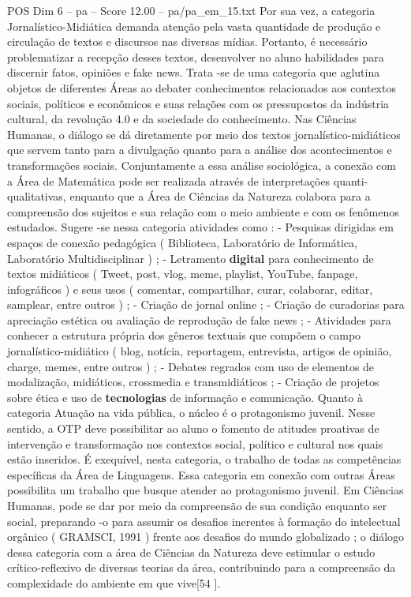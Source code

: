 \begin{textsample}{POS Dim 6 – pa – Score 12.00 – pa/pa\_em\_15.txt}
Por sua vez, a categoria Jornalístico-Midiática demanda atenção pela vasta quantidade de produção e circulação de textos e discursos nas diversas mídias.
Portanto, é necessário problematizar a recepção desses textos, desenvolver no aluno habilidades para discernir fatos, opiniões e fake news.
Trata -se de uma categoria que aglutina objetos de diferentes Áreas ao debater conhecimentos relacionados aos contextos sociais, políticos e econômicos e suas relações com os pressupostos da indústria cultural, da revolução 4.0 e da sociedade do conhecimento.
Nas Ciências Humanas, o diálogo se dá diretamente por meio dos textos jornalístico-midiáticos que servem tanto para a divulgação quanto para a análise dos acontecimentos e transformações sociais.
Conjuntamente a essa análise sociológica, a conexão com a Área de Matemática pode ser realizada através de interpretações quanti-qualitativas, enquanto que a Área de Ciências da Natureza colabora para a compreensão dos sujeitos e sua relação com o meio ambiente e com os fenômenos estudados.
Sugere -se nessa categoria atividades como : - Pesquisas dirigidas em espaços de conexão pedagógica ( Biblioteca, Laboratório de Informática, Laboratório Multidisciplinar ) ; - Letramento \textbf{digital} para conhecimento de textos midiáticos ( Tweet, post, vlog, meme, playlist, YouTube, fanpage, infográficos ) e seus usos ( comentar, compartilhar, curar, colaborar, editar, samplear, entre outros ) ; - Criação de jornal online ; - Criação de curadorias para apreciação estética ou avaliação de reprodução de fake news ; - Atividades para conhecer a estrutura própria dos gêneros textuais que compõem o campo jornalístico-midiático ( blog, notícia, reportagem, entrevista, artigos de opinião, charge, memes, entre outros ) ; - Debates regrados com uso de elementos de modalização, midiáticos, crossmedia e transmidiáticos ; - Criação de projetos sobre ética e uso de \textbf{tecnologias} de informação e comunicação.
Quanto à categoria Atuação na vida pública, o núcleo é o protagonismo juvenil.
Nesse sentido, a OTP deve possibilitar ao aluno o fomento de atitudes proativas de intervenção e transformação nos contextos social, político e cultural nos quais estão inseridos.
É exequível, nesta categoria, o trabalho de todas as competências específicas da Área de Linguagens.
Essa categoria em conexão com outras Áreas possibilita um trabalho que busque atender ao protagonismo juvenil.
Em Ciências Humanas, pode se dar por meio da compreensão de sua condição enquanto ser social, preparando -o para assumir os desafios inerentes à formação do intelectual orgânico ( GRAMSCI, 1991 ) frente aos desafios do mundo globalizado ; o diálogo dessa categoria com a área de Ciências da Natureza deve estimular o estudo crítico-reflexivo de diversas teorias da área, contribuindo para a compreensão da complexidade do ambiente em que vive[54 ].

\end{textsample}
